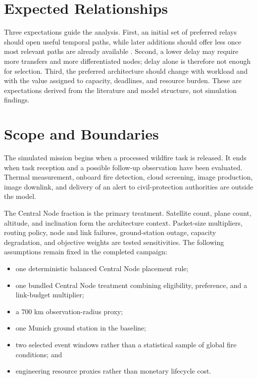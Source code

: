 \section{Expected Relationships}
Three expectations guide the analysis. First, an initial set of preferred relays should open useful temporal paths, while later additions should offer less once most relevant paths are already available \citep{Burleigh2022,Araniti2015,CCSDS2019}. Second, a lower delay may require more transfers and more differentiated nodes; delay alone is therefore not enough for selection. Third, the preferred architecture should change with workload and with the value assigned to capacity, deadlines, and resource burden. These are expectations derived from the literature and model structure, not simulation findings.

\section{Scope and Boundaries}
The simulated mission begins when a processed wildfire task is released. It ends when task reception and a possible follow-up observation have been evaluated. Thermal measurement, onboard fire detection, cloud screening, image production, image downlink, and delivery of an alert to civil-protection authorities are outside the model.

The Central Node fraction is the primary treatment. Satellite count, plane count, altitude, and inclination form the architecture context. Packet-size multipliers, routing policy, node and link failures, ground-station outage, capacity degradation, and objective weights are tested sensitivities. The following assumptions remain fixed in the completed campaign:

\begin{itemize}
\item one deterministic balanced Central Node placement rule;
\item one bundled Central Node treatment combining eligibility, preference, and a link-budget multiplier;
\item a 700 km observation-radius proxy;
\item one Munich ground station in the baseline;
\item two selected event windows rather than a statistical sample of global fire conditions; and
\item engineering resource proxies rather than monetary lifecycle cost.
\end{itemize}

